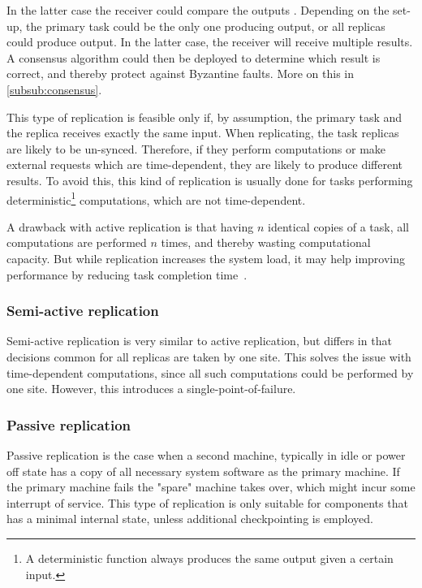 \documentclass{cslthse-msc}
\begin{document}
 In the latter case the receiver could compare the outputs .
Depending on the set-up, the primary task could be the only one producing output, or all replicas could produce output. In the latter case, the receiver will receive multiple results. A consensus algorithm could then be deployed to determine which result is correct, and thereby protect against Byzantine faults. More on this in \cref{subsub:consensus}.

This type of replication is feasible only if, by assumption, the primary task and the replica receives exactly the same input. When replicating, the task replicas are likely to be un-synced. Therefore, if they perform computations or make external requests which are time-dependent, they are likely to produce different results. To avoid this, this kind of replication is usually done for tasks performing deterministic\footnote{A deterministic function always produces the same output given a certain input.} computations, which are not time-dependent.

A drawback with active replication is that having $n$ identical copies of a task, all computations are performed $n$ times, and thereby wasting computational capacity. But while replication increases the system load, it may help improving performance by reducing task completion time~\cite{improvingPerformanceReplication}.

\subsubsection{Semi-active replication} \label{subsec:semi_active_replication}
Semi-active replication is very similar to active replication, but differs in that decisions common for all replicas are taken by one site. This solves the issue with time-dependent computations, since all such computations could be performed by one site. However, this introduces a single-point-of-failure. %

\subsubsection{Passive replication} \label{subsec:passive_replication}
Passive replication is the case when a second machine, typically in idle or power off state has a copy of all necessary system software as the primary machine. If the primary machine fails the "spare" machine takes over, which might incur some interrupt of service. This type of replication is only suitable for components that has a minimal internal state, unless additional checkpointing is employed.
\end{document}

